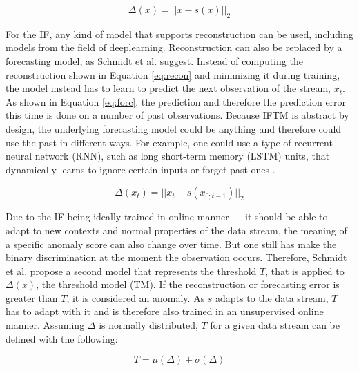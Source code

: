 \begin{equation} \label{eq:recon}
\Delta(x) = ||x-s(x)||_2
\end{equation}

For the IF, any kind of model that supports reconstruction can be used, including models from the field of deeplearning. Reconstruction can also be replaced by a forecasting model, as Schmidt et al. suggest. Instead of computing the reconstruction shown in Equation \ref{eq:recon} and minimizing it during training, the model instead has to learn to predict the next observation of the stream, $x_t$. As shown in Equation \ref{eq:forc}, the prediction and therefore the prediction error this time is done on a number of past observations. Because IFTM is abstract by design, the underlying forecasting model could be anything and therefore could use the past in different ways. For example, one could use a type of recurrent neural network (RNN), such as long short-term memory (LSTM) units, that dynamically learns to ignore certain inputs or forget past ones \cite{hochreiter1997long}.

\begin{equation} \label{eq:forc}
\Delta(x_{t}) = ||x_{t}-s(x_{0;t-1})||_2
\end{equation}

Due to the IF being ideally trained in online manner --- it should be able to adapt to new contexts and normal properties of the data stream, the meaning of a specific anomaly score can also change over time. But one still has make the binary discrimination at the moment the observation occurs. Therefore, Schmidt et al. propose a second model that represents the threshold $T$, that is applied to $\Delta(x)$, the threshold model (TM). If the reconstruction or forecasting error is greater than $T$, it is considered an anomaly. As $s$ adapts to the data stream, $T$ has to adapt with it and is therefore also trained in an unsupervised online manner. Assuming $\Delta$ is normally distributed, $T$ for a given data stream can be defined with the following:

\begin{equation} \label{eq:tm}
T = \mu(\Delta) + \sigma(\Delta)
\end{equation}

